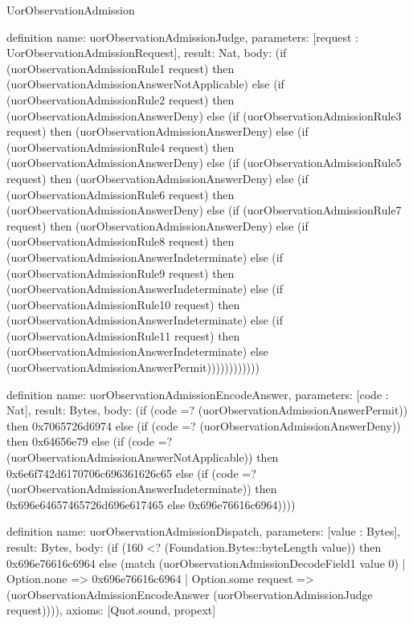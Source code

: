 \begin{lexlean}{UorObservationAdmission}
\begin{semanticmodule}
definition{
  name: uorObservationAdmissionJudge,
  parameters: [request : UorObservationAdmissionRequest],
  result: Nat,
  body: (if (uorObservationAdmissionRule1 request) then (uorObservationAdmissionAnswerNotApplicable) else (if (uorObservationAdmissionRule2 request) then (uorObservationAdmissionAnswerDeny) else (if (uorObservationAdmissionRule3 request) then (uorObservationAdmissionAnswerDeny) else (if (uorObservationAdmissionRule4 request) then (uorObservationAdmissionAnswerDeny) else (if (uorObservationAdmissionRule5 request) then (uorObservationAdmissionAnswerDeny) else (if (uorObservationAdmissionRule6 request) then (uorObservationAdmissionAnswerDeny) else (if (uorObservationAdmissionRule7 request) then (uorObservationAdmissionAnswerDeny) else (if (uorObservationAdmissionRule8 request) then (uorObservationAdmissionAnswerIndeterminate) else (if (uorObservationAdmissionRule9 request) then (uorObservationAdmissionAnswerIndeterminate) else (if (uorObservationAdmissionRule10 request) then (uorObservationAdmissionAnswerIndeterminate) else (if (uorObservationAdmissionRule11 request) then (uorObservationAdmissionAnswerIndeterminate) else (uorObservationAdmissionAnswerPermit))))))))))))
}

definition{
  name: uorObservationAdmissionEncodeAnswer,
  parameters: [code : Nat],
  result: Bytes,
  body: (if (code =? (uorObservationAdmissionAnswerPermit)) then 0x7065726d6974 else (if (code =? (uorObservationAdmissionAnswerDeny)) then 0x64656e79 else (if (code =? (uorObservationAdmissionAnswerNotApplicable)) then 0x6e6f742d6170706c696361626c65 else (if (code =? (uorObservationAdmissionAnswerIndeterminate)) then 0x696e64657465726d696e617465 else 0x696e76616c6964))))
}

definition{
  name: uorObservationAdmissionDispatch,
  parameters: [value : Bytes],
  result: Bytes,
  body: (if (160 <? (Foundation.Bytes::byteLength value)) then 0x696e76616c6964 else (match (uorObservationAdmissionDecodeField1 value 0)
    | Option.none => 0x696e76616c6964
    | Option.some request => (uorObservationAdmissionEncodeAnswer (uorObservationAdmissionJudge request)))),
  axioms: [Quot.sound, propext]
}
\end{semanticmodule}
\end{lexlean}
